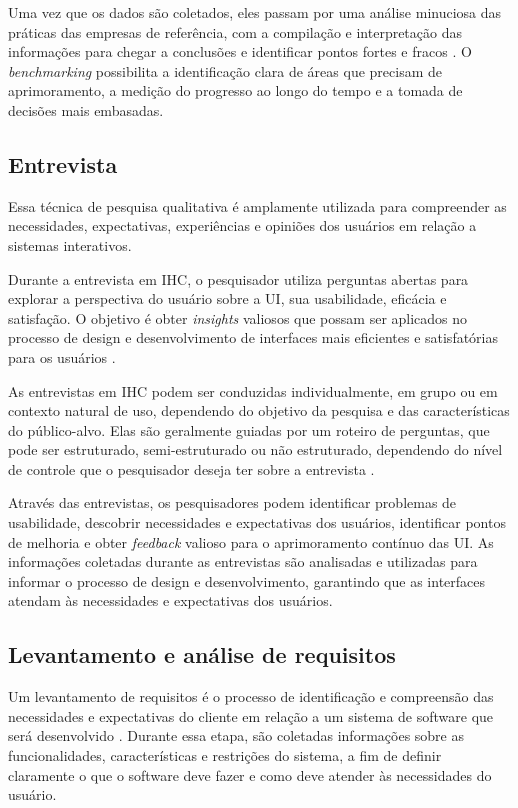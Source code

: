 Uma vez que os dados são coletados, eles passam por uma análise minuciosa das práticas das empresas de referência, com a compilação e interpretação das informações para chegar a conclusões e identificar pontos fortes e fracos \cite{rogers2013design}. O \textit{benchmarking} possibilita a identificação clara de áreas que precisam de aprimoramento, a medição do progresso ao longo do tempo e a tomada de decisões mais embasadas.

\subsection{\textbf{Entrevista}}

Essa técnica de pesquisa qualitativa é amplamente utilizada para compreender as necessidades, expectativas, experiências e opiniões dos usuários em relação a sistemas interativos\cite{rogers2013design}.

Durante a entrevista em \gls{IHC}, o pesquisador utiliza perguntas abertas para explorar a perspectiva do usuário sobre a \gls{UI}, sua usabilidade, eficácia e satisfação. O objetivo é obter \textit{insights} valiosos que possam ser aplicados no processo de design e desenvolvimento de interfaces mais eficientes e satisfatórias para os usuários \cite{barbosa2021interaccao} .

As entrevistas em \gls{IHC} podem ser conduzidas individualmente, em grupo ou em contexto natural de uso, dependendo do objetivo da pesquisa e das características do público-alvo. Elas são geralmente guiadas por um roteiro de perguntas, que pode ser estruturado, semi-estruturado ou não estruturado, dependendo do nível de controle que o pesquisador deseja ter sobre a entrevista \cite{barbosa2021interaccao}.

Através das entrevistas, os pesquisadores podem identificar problemas de usabilidade, descobrir necessidades e expectativas dos usuários, identificar pontos de melhoria e obter \textit{feedback} valioso para o aprimoramento contínuo das \gls{UI}. As informações coletadas durante as entrevistas são analisadas e utilizadas para informar o processo de design e desenvolvimento, garantindo que as interfaces atendam às necessidades e expectativas dos usuários.

\subsection{\textbf{Levantamento e análise de requisitos}}

Um levantamento de requisitos é o processo de identificação e compreensão das necessidades e expectativas do cliente em relação a um sistema de software que será desenvolvido \cite{mach}. Durante essa etapa, são coletadas informações sobre as funcionalidades, características e restrições do sistema, a fim de definir claramente o que o software deve fazer e como deve atender às necessidades do usuário.

